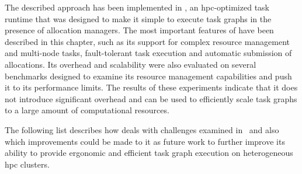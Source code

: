 The described approach has been implemented in \hyperqueue{}, an
\gls{hpc}-optimized task runtime that was designed to make it simple to execute
task graphs in the presence of allocation managers. The most important features of
\hyperqueue{} have been described in this chapter, such as its support for complex
resource management and multi-node tasks, fault-tolerant task execution and automatic submission of
allocations. Its overhead and scalability were also evaluated on several benchmarks designed to
examine its resource management capabilities and push it to its performance limits. The results of
these experiments indicate that it does not introduce significant overhead and can be used to
efficiently scale task graphs to a large amount of computational resources.

The following list describes how \hyperqueue{} deals with challenges examined
in~ and also which improvements could be made to it as future work to
further improve its ability to provide ergonomic and efficient task graph execution on
heterogeneous \gls{hpc} clusters.
